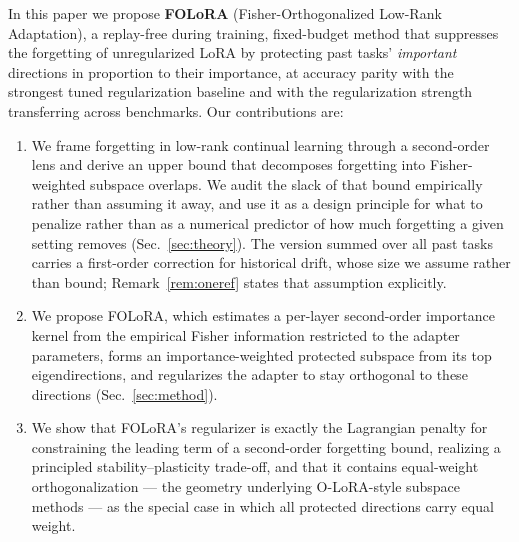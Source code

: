 In this paper we propose \textbf{FOLoRA} (Fisher-Orthogonalized Low-Rank Adaptation), a
replay-free during training, fixed-budget method that suppresses the forgetting of unregularized LoRA by
protecting past tasks' \emph{important} directions in proportion to their importance, at
accuracy parity with the strongest tuned regularization baseline and with the regularization
strength transferring across benchmarks. Our contributions are:

\begin{enumerate}
\item We frame forgetting in low-rank continual learning through a second-order lens and
derive an upper bound that decomposes forgetting into Fisher-weighted subspace overlaps.
We audit the slack of that bound empirically rather than assuming it away, and use it as a
design principle for what to penalize rather than as a numerical predictor of how much
forgetting a given setting removes (Sec.~\ref{sec:theory}). The version summed over all
past tasks carries a first-order correction for historical drift, whose size we assume
rather than bound; Remark~\ref{rem:oneref} states that assumption explicitly.
\item We propose FOLoRA, which estimates a per-layer second-order importance kernel from
the empirical Fisher information restricted to the adapter parameters, forms an
importance-weighted protected subspace from its top eigendirections, and regularizes the
adapter to stay orthogonal to these directions (Sec.~\ref{sec:method}).
\item We show that FOLoRA's regularizer is exactly the
Lagrangian penalty for constraining the leading term of a second-order forgetting bound,
realizing a principled stability--plasticity trade-off, and that it contains equal-weight
orthogonalization --- the geometry underlying O-LoRA-style subspace methods --- as the
special case in which all protected directions carry equal weight.

\end{enumerate}
